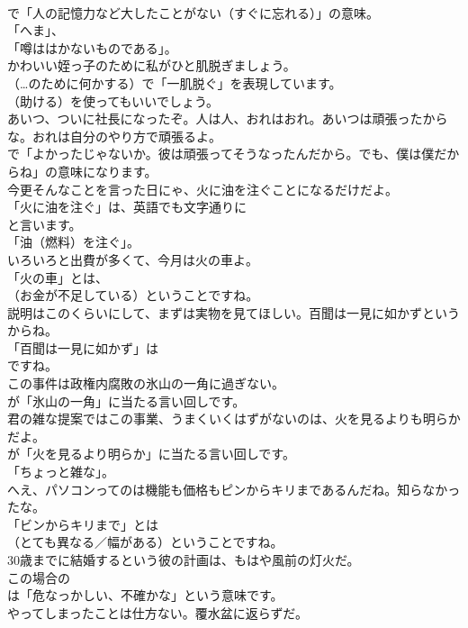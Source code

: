 \documentclass[8pt]{extreport}
\begin{document}
\begin{CJK}{UTF8}{min}
\\	で「人の記憶力など大したことがない（すぐに忘れる）」の意味。
\\	「へま」、
\\	「噂ははかないものである」。	
\\	かわいい姪っ子のために私がひと肌脱ぎましょう。 
\\	（…のために何かする）で「一肌脱ぐ」を表現しています。
\\	（助ける）を使ってもいいでしょう。	
\\	あいつ、ついに社長になったぞ。人は人、おれはおれ。あいつは頑張ったからな。おれは自分のやり方で頑張るよ。 
\\	で「よかったじゃないか。彼は頑張ってそうなったんだから。でも、僕は僕だからね」の意味になります。	
\\	今更そんなことを言った日にゃ、火に油を注ぐことになるだけだよ。 
\\	「火に油を注ぐ」は、英語でも文字通りに
\\	と言います。
\\	「油（燃料）を注ぐ」。	
\\	いろいろと出費が多くて、今月は火の車よ。 
\\	「火の車」とは、
\\	（お金が不足している）ということですね。	
\\	説明はこのくらいにして、まずは実物を見てほしい。百聞は一見に如かずというからね。 
\\	「百聞は一見に如かず」は 
\\	ですね。	
\\	この事件は政権内腐敗の氷山の一角に過ぎない。 
\\	が「氷山の一角」に当たる言い回しです。	
\\	君の雑な提案ではこの事業、うまくいくはずがないのは、火を見るよりも明らかだよ。 
\\	が「火を見るより明らか」に当たる言い回しです。
\\	「ちょっと雑な」。	
\\	へえ、パソコンってのは機能も価格もピンからキリまであるんだね。知らなかったな。 
\\	「ビンからキリまで」とは
\\	（とても異なる／幅がある）ということですね。	
\\	30歳までに結婚するという彼の計画は、もはや風前の灯火だ。 
\\	この場合の
\\	は「危なっかしい、不確かな」という意味です。	
\\	やってしまったことは仕方ない。覆水盆に返らずだ。 

\end{CJK}
\end{document}
